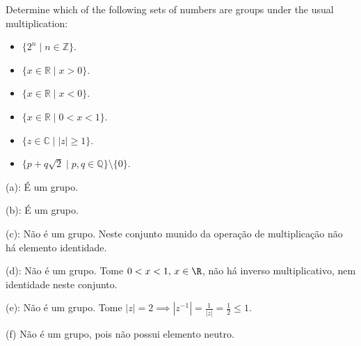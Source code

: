 \begin{exercicio}{1.56}
	Determine which of the following sets of numbers are groups under the usual multiplication:

	\begin{itemize}
		\item[(a)] $\{ 2^n \mid n \in \mathbb{Z} \}$.
		\item[(b)] $\{ x \in \mathbb{R} \mid x > 0 \}$.
		\item[(c)] $\{ x \in \mathbb{R} \mid x < 0 \}$.
		\item[(d)] $\{ x \in \mathbb{R} \mid 0 < x < 1 \}$.
		\item[(e)] $\{ z \in \mathbb{C} \mid |z| \geq 1 \}$.	
		\item[(f)] $\{ p + q \sqrt{2} \mid p, q \in \mathbb{Q} \} \setminus \{0\}$.
	\end{itemize}
\end{exercicio}

\begin{solucao}
	(a): É um grupo.

	(b): É um grupo.

	(c): Não é um grupo. Neste conjunto munido da operação de multiplicação não há elemento identidade.

	(d): Não é um grupo. Tome \(0 < x < 1, \, x \in \R\), não há inverso multiplicativo, nem identidade neste conjunto.

	(e): Não é um grupo. Tome \(|z| = 2 \implies |z^{-1}| = \frac{1}{|z|} = \frac{1}{2} \leq 1\).

	(f) Não é um grupo, pois não possui elemento neutro.
\end{solucao}